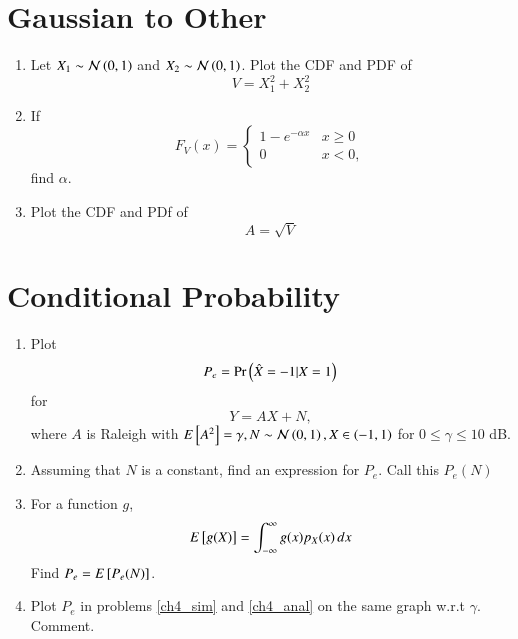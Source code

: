 \documentclass[journal,12pt,twocolumn]{IEEEtran}
\renewcommand\thesection{\arabic{section}}
\begin{document}
\section{Gaussian to Other}
\begin{enumerate}[label=\thesection.\arabic*
,ref=\thesection.\theenumi]
\item
Let $X_1 \sim  \mathcal{N}\left(0,1\right)$ and $X_2 \sim  \mathcal{N}\left(0,1\right)$. Plot the CDF and PDF of
%
\begin{equation}
V = X_1^2 + X_2^2
\end{equation}
%
%
%
\item
If
%
\begin{equation}
F_{V}(x) = 
\begin{cases}
1 - e^{-\alpha x} & x \geq 0 \\
0 & x < 0,
\end{cases}
\end{equation}
%
find $\alpha$.
%
\item
\label{ch3_raleigh_sim}
Plot the CDF and PDf of
%
\begin{equation}
A = \sqrt{V}
\end{equation}
%
\end{enumerate}
\section{Conditional Probability}
\begin{enumerate}[label=\thesection.\arabic*
,ref=\thesection.\theenumi]
\item
\label{ch4_sim}
Plot 
\begin{equation}
P_e = \Pr\left(\hat{X} = -1|X=1\right)
\end{equation}
%
for 
\begin{equation}
Y = AX+N,
\end{equation}
where $A$ is Raleigh with $E{}\left[A^2\right] = \gamma, N \sim \mathcal{N}\left(0,1\right), X \in \left(-1,1\right)$ for $0 \le \gamma \le 10$ dB.
%
\item
Assuming that $N$ is a constant, find an expression for $P_e$.  Call this $P_e(N)$
%
\item
%
\label{ch4_anal}
For a function $g$,
\begin{equation}
E{}\left[g(X)\right] = \int_{-\infty}^{\infty}g(x)p_{X}(x)\, dx
\end{equation}
%
Find $P_e = E{}\left[P_e(N)\right]$.
%
\item
Plot $P_e$ in problems \ref{ch4_sim} and \ref{ch4_anal} on the same graph w.r.t $\gamma$.  Comment.
		\end{enumerate}
\end{document}
